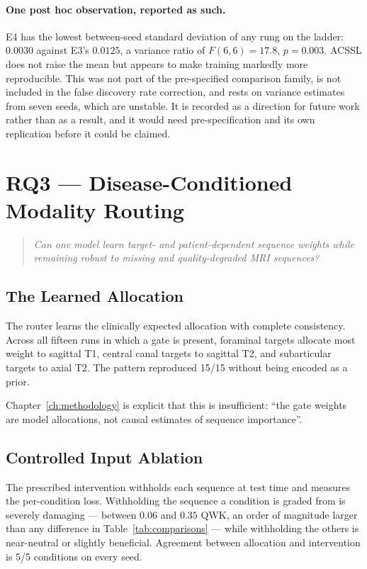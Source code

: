 \documentclass[12pt,a4paper]{report}
\begin{document}
\paragraph{One post hoc observation, reported as such.} E4 has the lowest
between-seed standard deviation of any rung on the ladder: $0.0030$ against
E3's $0.0125$, a variance ratio of $F(6,6) = 17.8$, $p = 0.003$. ACSSL does not
raise the mean but appears to make training markedly more reproducible. This was
not part of the pre-specified comparison family, is not included in the false
discovery rate correction, and rests on variance estimates from seven seeds,
which are unstable. It is recorded as a direction for future work rather than as
a result, and it would need pre-specification and its own replication before it
could be claimed.

\section{RQ3 --- Disease-Conditioned Modality Routing}
\label{sec:results-rq3}

\begin{quote}
\emph{Can one model learn target- and patient-dependent sequence weights while
remaining robust to missing and quality-degraded MRI sequences?}
\end{quote}

\subsection{The Learned Allocation}

The router learns the clinically expected allocation with complete consistency.
Across all fifteen runs in which a gate is present, foraminal targets allocate
most weight to sagittal T1, central canal targets to sagittal T2, and
subarticular targets to axial T2. The pattern reproduced 15/15 without being
encoded as a prior.

Chapter~\ref{ch:methodology} is explicit that this is insufficient:
\enquote{the gate weights are model allocations, not causal estimates of sequence
importance}.

\subsection{Controlled Input Ablation}
\label{sec:results-rq3-ablation}

The prescribed intervention withholds each sequence at test time and measures the
per-condition loss. Withholding the sequence a condition is graded from is
severely damaging --- between $0.06$ and $0.35$ QWK, an order of magnitude larger
than any difference in Table~\ref{tab:comparisons} --- while withholding the
others is near-neutral or slightly beneficial. Agreement between allocation and
intervention is 5/5 conditions on every seed.
\end{document}
